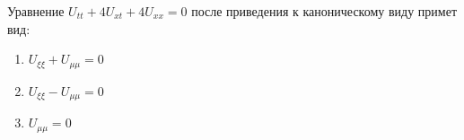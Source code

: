 Уравнение \(U_{tt}+4U_{xt}+4U_{xx}=0\) после приведения к каноническому виду примет вид:

\begin{enumerate}[label=\arabic*)]
    \item \(U_{\xi \xi }+U_{\mu \mu }=0\)
    \item \(U_{\xi \xi }-U_{\mu \mu }=0\)
    \item \(U_{\mu \mu }=0\)
\end{enumerate}


